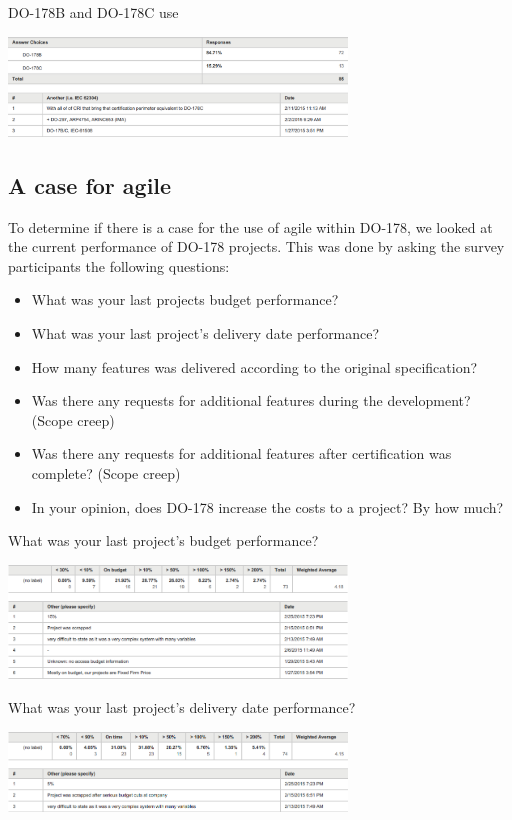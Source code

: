 \documentclass[conference]{IEEEtran}
\begin{document}
\begin{table}[t!]
\centering
\caption{DO-178B and DO-178C use}
\includegraphics[width=90mm]{BvsC.png}
\end{table}

\subsection{A case for agile}
To determine if there is a case for the use of agile within DO-178, we looked at the current performance of DO-178 projects. This was done by asking the survey participants the following questions:

\begin{itemize}
	\item What was your last projects budget performance?
	\item What was your last project's delivery date performance?
	\item How many features was delivered according to the original specification?
	\item Was there any requests for additional features during the development? (Scope creep)
	\item Was there any requests for additional features after certification was complete? (Scope creep)
	\item In your opinion, does DO-178 increase the costs to a project? By how much?
\end{itemize}

\begin{table}[t!]
\centering
\caption{What was your last project's budget performance?}
\includegraphics[width=90mm]{What_was_your_last_projects_budget_performance.png}
\end{table}

\begin{table}[t!]
\centering
\caption{What was your last project's delivery date performance?}
\includegraphics[width=90mm]{What_was_your_last_projects_delivery_date_performance.png}
\end{table}
\end{document}
